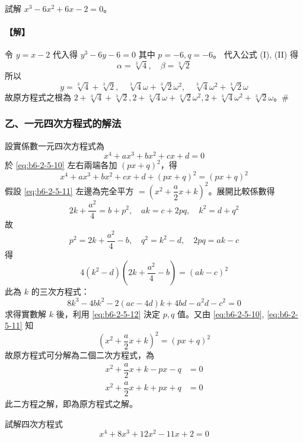 \begin{example}\label{ex:b6-2-24}
試解 $x^3-6x^2+6x-2=0$。
\end{example}

\paragraph{【解】}
令 $y=x-2$ 代入得 $y^3-6y-6=0$ 其中 $p=-6, q=-6$。
代入公式 (I), (II) 得
\[ \alpha = \sqrt[3]{4}, \quad \beta = \sqrt[3]{2} \]
所以
\[ y = \sqrt[3]{4}+\sqrt[3]{2}, \quad \sqrt[3]{4}\omega+\sqrt[3]{2}\omega^2, \quad \sqrt[3]{4}\omega^2+\sqrt[3]{2}\omega \]
故原方程式之根為 $2+\sqrt[3]{4}+\sqrt[3]{2}, 2+\sqrt[3]{4}\omega+\sqrt[3]{2}\omega^2, 2+\sqrt[3]{4}\omega^2+\sqrt[3]{2}\omega$。\hfill$\#$

\subsubsection*{乙、一元四次方程式的解法}\label{subsec:b6-2-5-b}

設實係數一元四次方程式為
\begin{equation}
x^4 + ax^3 + bx^2 + cx + d = 0 \label{eq:b6-2-5-10}
\end{equation}
於 \eqref{eq:b6-2-5-10} 左右兩端各加 $(px+q)^2$，得
\begin{equation}
x^4 + ax^3 + bx^2 + cx + d + (px+q)^2 = (px+q)^2 \label{eq:b6-2-5-11}
\end{equation}
假設 \eqref{eq:b6-2-5-11} 左邊為完全平方 $= \left(x^2 + \dfrac{a}{2}x + k\right)^2$。展開比較係數得
\begin{equation}
2k + \dfrac{a^2}{4} = b + p^2, \quad ak = c + 2pq, \quad k^2 = d + q^2 \label{eq:b6-2-5-12}
\end{equation}
故
\[ p^2 = 2k + \dfrac{a^2}{4} - b, \quad q^2 = k^2 - d, \quad 2pq = ak - c \]
得
\[ 4(k^2-d)\left(2k+\dfrac{a^2}{4}-b\right) = (ak-c)^2 \]
此為 $k$ 的三次方程式：
\[ 8k^3 - 4bk^2 - 2(ac-4d)k + 4bd - a^2d - c^2 = 0 \]
求得實數解 $k$ 後，利用 \eqref{eq:b6-2-5-12} 決定 $p, q$ 值。又由 \eqref{eq:b6-2-5-10}, \eqref{eq:b6-2-5-11} 知
\[ \left(x^2 + \dfrac{a}{2}x + k\right)^2 = (px+q)^2 \]
故原方程式可分解為二個二次方程式，為
\begin{align*}
x^2 + \dfrac{a}{2}x + k - px - q &= 0 \\
x^2 + \dfrac{a}{2}x + k + px + q &= 0
\end{align*}
此二方程之解，即為原方程式之解。

\begin{example}\label{ex:b6-2-25}
試解四次方程式
\[ x^4 + 8x^3 + 12x^2 - 11x + 2 = 0 \]
\end{example}

